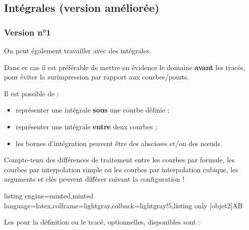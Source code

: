 \documentclass[11pt,a4paper]{ltxdoc}
\begin{document}
\pagebreak

\subsection{Intégrales (version améliorée)}

\subsubsection{Version n°1}\label{integr}

On peut également travailler avec des intégrales.

Dans ce cas il est préférable de mettre en évidence le domaine \textbf{avant} les tracés, pour éviter la surimpression par rapport aux courbes/points.

\smallskip

Il est possible de :

\begin{itemize}
  \item représenter une intégrale \textbf{sous} une courbe définie ;
  \item représenter une intégrale \textbf{entre} deux courbes ;
  \item les bornes d'intégration peuvent être des abscisses et/ou des nœuds.
\end{itemize}

\smallskip

{\small\faBomb} Compte-tenu des différences de traitement entre les courbes par formule, les courbes par interpolation simple ou les courbes par interpolation cubique, les arguments et clés peuvent différer suivant la configuration !

\begin{tcblisting}{listing engine=minted,minted language=latex,colframe=lightgray,colback=lightgray!5,listing only}
[objet2]{A}{B}
\end{tcblisting}

Les \MontreCode{[clés]} pour la définition ou le tracé, optionnelles, disponibles sont :
\end{document}
